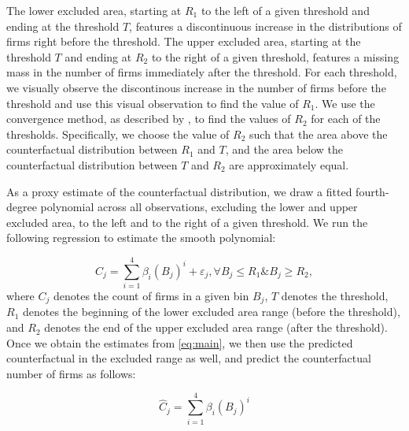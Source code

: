 The lower excluded area, starting at $R_{1}$ to the left of a given threshold and ending at the threshold $T$, features a discontinuous
increase in the distributions of firms right before the threshold. The upper excluded area, starting at the threshold $T$ and ending
at $R_{2}$ to the right of a given threshold, features a missing mass in the number of firms immediately after the threshold. For each
threshold, we visually observe the discontinous increase in the number of firms before the threshold and use this visual observation to find the value of $R_{1}$. We use the convergence method, as described by \citet{kleven2013using}, to find the values of $R_{2}$ for each of the thresholds. Specifically, we choose the value of $R_{2}$ such that the area above the counterfactual distribution between $R_{1}$ and $T$, and the area below the counterfactual distribution between $T$ and $R_{2}$ are approximately equal.

As a proxy estimate of the counterfactual distribution, we draw a fitted fourth-degree polynomial across all observations, excluding
the lower and upper excluded area, to the left and to the right of a given threshold. We run the following regression to estimate the
smooth polynomial: 

\begin{equation}
  \label{eq:main}  
  C_{j}=\sum_{i=1}^{4}\beta_{i}(B_{j})^{i}+\varepsilon_{j},\forall B_{j}\leq R_{1}\&B_{j}\geq R_{2},
\end{equation}
where $C_{j}$ denotes the count of firms in a given bin $B_{j}$, $T$ denotes the threshold, $R_{1}$ denotes the beginning of the lower excluded area range (before the threshold), and $R_{2}$ denotes the end of the upper excluded area range (after the threshold). Once we obtain the estimates from \cref{eq:main}, we then use the predicted counterfactual in the excluded range as well, and predict the counterfactual number of firms as follows:

\begin{equation}
  \label{eq:counterfactual}  
  \hat{C}_{j}=\sum_{i=1}^{4}\beta_{i}(B_{j})^{i}
\end{equation}

